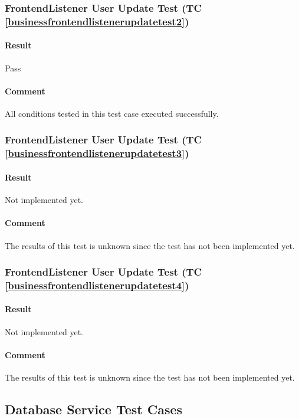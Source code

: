 \documentclass[hidelinks,english]{article}
\begin{document}
			\subsubsection{FrontendListener User Update Test (TC \ref{businessfrontendlistenerupdatetest2})}
				\paragraph{Result} Pass
				\paragraph{Comment} All conditions tested in this test case executed successfully.
				
			\subsubsection{FrontendListener User Update Test (TC \ref{businessfrontendlistenerupdatetest3})}
				\paragraph{Result} Not implemented yet.
				\paragraph{Comment} The results of this test is unknown since the test has not been implemented yet.
				
			\subsubsection{FrontendListener User Update Test (TC \ref{businessfrontendlistenerupdatetest4})}
				\paragraph{Result} Not implemented yet.
				\paragraph{Comment} The results of this test is unknown since the test has not been implemented yet.
				
		
		\subsection{Database Service Test Cases}
\end{document}
